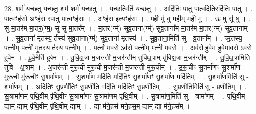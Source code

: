 \documentclass[17pt]{extarticle}
\begin{document}
28. शर्म॑ यच्छतु यच्छतु॒ शर्म॒ शर्म॑ यच्छतु । . य॒च्छ॒त्विति॑ यच्छतु । . अदि॑तिः पातु पा॒त्वदि॑ति॒रदि॑तिः पातु । . पा॒त्वꣳह॑सो॒ अꣳह॑स स्पातु पा॒त्वꣳह॑सः । . अꣳह॑स॒ इत्यꣳह॑सः । . म॒ही मु॑ वु म॒हीम् म॒ही मु॑ । . ऊ॒ षु सू॑ षु । . सु मा॒तर॑म् मा॒तर॒(ग्म्॒) सु सु मा॒तर᳚म् । . मा॒तर(ग्म्॑) सुव्र॒ताना(ग्म्॑) सुव्र॒ताना᳚म् मा॒तर॑म् मा॒तर(ग्म्॑) सुव्र॒ताना᳚म् । . सु॒व्र॒ताना॑ मृ॒तस्य॒ र्तस्य॑ सुव्र॒ताना(ग्म्॑) सुव्र॒ताना॑ मृ॒तस्य॑ । . सु॒व्र॒ताना॒मिति॑ सु - व्र॒ताना᳚म् । . ऋ॒तस्य॒ पत्नी॒म् पत्नी॑ मृ॒तस्य॒ र्तस्य॒ पत्नी᳚म् । . पत्नी॒ मव॒से ऽव॑से॒ पत्नी॒म् पत्नी॒ मव॑से । . अव॑से हुवेम हुवे॒माव॒से ऽव॑से हुवेम । . हु॒वे॒मेति॑ हुवेम । . तु॒वि॒क्ष॒त्रा म॒जर॑न्ती म॒जर॑न्तीम् तुविक्ष॒त्राम् तु॑विक्ष॒त्रा म॒जर॑न्तीम् । . तु॒वि॒क्ष॒त्रामिति॑ तुवि - क्ष॒त्राम् । . अ॒जर॑न्ती मुरू॒ची मु॑रू॒ची म॒जर॑न्ती म॒जर॑न्ती मुरू॒चीम् । . उ॒रू॒चीꣳ सु॒शर्मा॑णꣳ सु॒शर्मा॑ण मुरू॒ची मु॑रू॒चीꣳ सु॒शर्मा॑णम् । . सु॒शर्मा॑ण॒ मदि॑ति॒ मदि॑तिꣳ सु॒शर्मा॑णꣳ सु॒शर्मा॑ण॒ मदि॑तिम् । . सु॒शर्मा॑ण॒मिति॑ सु - शर्मा॑णम् । . अदि॑तिꣳ सु॒प्रणी॑तिꣳ सु॒प्रणी॑ति॒ मदि॑ति॒ मदि॑तिꣳ सु॒प्रणी॑तिम् । . सु॒प्रणी॑ति॒मिति॑ सु - प्रणी॑तिम् । . सु॒त्रामा॑णम् पृथि॒वीम् पृ॑थि॒वीꣳ सु॒त्रामा॑णꣳ सु॒त्रामा॑णम् पृथि॒वीम् । . सु॒त्रामा॑ण॒मिति॑ सु - त्रामा॑णम् । . पृ॒थि॒वीम् द्याम् द्याम् पृ॑थि॒वीम् पृ॑थि॒वीम् द्याम् । . द्या म॑ने॒हस॑ मने॒हस॒म् द्याम् द्या म॑ने॒हस᳚म् । \newline
\end{document}
